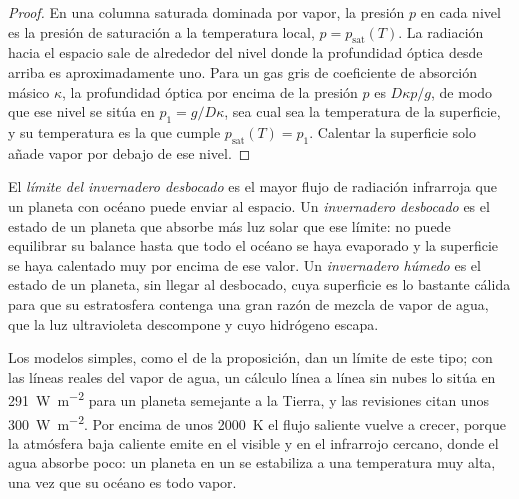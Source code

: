 \begin{proof}
En una columna saturada dominada por vapor, la presión $p$ en cada
nivel es la presión de saturación a la temperatura local, $p =
p_\mathrm{sat}(T)$. La radiación hacia el espacio sale de alrededor del nivel
donde la profundidad óptica desde arriba es aproximadamente uno. Para un gas gris de coeficiente
de absorción másico $\kappa$, la profundidad óptica por encima de la presión $p$
es $D\kappa p/g$, de modo que ese nivel se sitúa en $p_1 = g/D\kappa$, sea cual sea la
temperatura de la superficie, y su temperatura es la que cumple
$p_\mathrm{sat}(T) = p_1$. Calentar la superficie solo añade vapor por debajo de ese nivel.
\end{proof}

\begin{definition}\label{def:b3:planetary-atmospheres:runaway}
El \emph{límite del invernadero desbocado} es el
mayor flujo de radiación infrarroja que un planeta con océano puede enviar al
espacio. Un \emph{invernadero desbocado} es el estado
de un planeta que absorbe más luz solar que ese límite: no puede equilibrar
su balance hasta que todo el océano se haya evaporado y la superficie se haya
calentado muy por encima de ese valor. Un \emph{invernadero húmedo}
es el estado de un planeta, sin llegar al desbocado, cuya superficie es lo bastante cálida
para que su estratosfera contenga una gran razón de mezcla de vapor de agua,
que la luz ultravioleta descompone y cuyo hidrógeno escapa.
\end{definition}

Los modelos simples, como el de la proposición, dan un límite de este tipo; con las
líneas reales del vapor de agua, un cálculo línea a línea sin nubes
lo sitúa en \qty{291}{W.m^{-2}} para un planeta semejante a la Tierra, y las
revisiones citan unos \qty{300}{W.m^{-2}}. Por encima de unos \qty{2000}{K} el
flujo saliente vuelve a crecer, porque la atmósfera baja caliente emite en el
visible y en el infrarrojo cercano, donde el agua absorbe poco: un planeta en un
 se estabiliza a una temperatura muy alta, una vez que su océano
es todo vapor.

